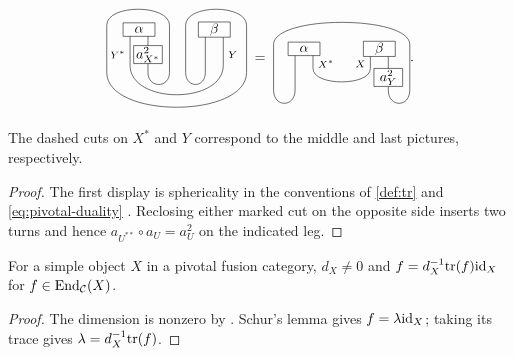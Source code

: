 \documentclass{amsart}
\begin{document}
\begin{lemma}
\[\begin{tikzpicture}[x=.9cm,y=-.9cm,baseline=(current bounding box.center)]
\draw (.85,0)--(.85,.7);
\draw (.85,.7)--(.85,1.2) .. controls (.85,1.65) and (1.45,1.65) .. (1.45,1.2)
 -- (1.45,-.12) .. controls (1.45,-.72) and (-.3,-.72) .. (-.3,-.12)
 -- (-.3,1.2) .. controls (-.3,2.5) and (3.6,2.5) .. (3.6,1.2)
 -- (3.6,-.12) .. controls (3.6,-.72) and (1.9,-.72) .. (1.9,-.12)
 -- (1.9,1.2) .. controls (1.9,1.65) and (2.45,1.65) .. (2.45,1.2)--(2.45,0);
\draw (.35,0)--(.35,1.0) .. controls (.35,2.1) and (2.95,2.1) .. (2.95,1.0)--(2.95,0);
\node[left] at (.35,.7) {\scriptsize $Y^*$};
\node[right] at (2.95,.7) {\scriptsize $Y$};
\node[draw,fill=white,minimum width=.8cm,minimum height=.34cm,inner sep=1pt] at (.6,0) {$\alpha$};
\node[draw,fill=white,minimum width=.8cm,minimum height=.34cm,inner sep=1pt] at (2.7,0) {$\beta$};
\node[draw,fill=white,minimum width=.72cm,minimum height=.43cm,inner sep=1pt] at (.85,.7) {$a_{X^*}^{2}$};
\end{tikzpicture}
\;=\;
\begin{tikzpicture}[x=.9cm,y=-.9cm,baseline=(current bounding box.center)]
\draw (.85,0)--(.85,.55) .. controls (.85,1.05) and (2.45,1.05) .. (2.45,.55)--(2.45,0);
\draw (2.95,0)--(2.95,.8);
\draw (.35,0)--(.35,1.15) .. controls (.35,1.65) and (-.25,1.65) .. (-.25,1.15)
 -- (-.25,-.12) .. controls (-.25,-.95) and (3.55,-.95) .. (3.55,-.12)
 -- (3.55,1.15) .. controls (3.55,1.65) and (2.95,1.65) .. (2.95,1.15)--(2.95,.8);
\node[right] at (.85,.42) {\scriptsize $X^*$};
\node[left] at (2.45,.42) {\scriptsize $X$};
\node[draw,fill=white,minimum width=.8cm,minimum height=.34cm,inner sep=1pt] at (.6,0) {$\alpha$};
\node[draw,fill=white,minimum width=.8cm,minimum height=.34cm,inner sep=1pt] at (2.7,0) {$\beta$};
\node[draw,fill=white,minimum width=.72cm,minimum height=.43cm,inner sep=1pt] at (2.95,.8) {$a_Y^{2}$};
\end{tikzpicture}.
\]
The dashed cuts on $X^*$ and $Y$ correspond to the middle and last
pictures, respectively.
\end{lemma}
\begin{proof}
The first display is sphericality in the conventions of \eqref{def:tr}
and \eqref{eq:pivotal-duality} \cite[Theorem~4.7.15]{EGNO15}.
Reclosing either marked cut on the opposite side inserts two turns and hence
$a_{U^{**}}\circ a_U=a_U^2$ on the indicated leg.
\end{proof}

\begin{lemma}\label{lem:simple}
For a simple object $X$ in a pivotal fusion category, $d_X\ne0$ and
$f=d_X^{-1}\mathrm{tr}(f)\mathrm{id}_X$ for $f\in\mathrm{End}_{\mathcal{C}}(X)$.
\end{lemma}
\begin{proof}
The dimension is nonzero by \cite[Proposition~4.8.4]{EGNO15}.
Schur's lemma gives $f=\lambda\mathrm{id}_X$; taking its trace gives
$\lambda=d_X^{-1}\mathrm{tr}(f)$.
\end{proof}
\end{document}
